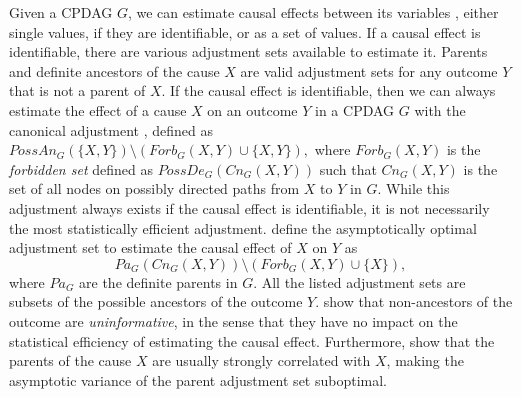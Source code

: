 Given a \ac{CPDAG} $G$, we can estimate causal effects between its variables \citep{maathuis2009estimating}, either single values, if they are identifiable, or as a set of values.
If a causal effect is identifiable, there are various adjustment sets available to estimate it.
Parents \citep{maathuis2015generalized} and definite ancestors \citep{henckel2024adjustment} of the cause $X$ are valid adjustment sets for any outcome $Y$ that is not a parent of $X$.
If the causal effect is identifiable, then we can always estimate the effect of a cause $X$ on an outcome $Y$ in a CPDAG $G$ with the canonical adjustment \citep{perkovic2018complete}, defined as 
$
PossAn_G(\{X,Y\}) \setminus (Forb_G(X,Y) \cup \{X, Y \}),
$
where $Forb_G(X,Y)$ is the \emph{forbidden set} defined as $PossDe_G(Cn_G(X,Y))$ such that $Cn_G(X,Y)$ is the set of all nodes on  possibly directed paths from $X$ to $Y$ in $G$. While this adjustment always exists if the causal effect is identifiable, it is not necessarily the most statistically efficient adjustment.
\citet{henckel2022graphical} define the asymptotically optimal adjustment set to estimate the causal effect of $X$ on $Y$ as
$$
Pa_G(Cn_G(X,Y)) \setminus (Forb_G(X,Y) \cup \{X\}),
$$
where $Pa_G$ are the definite parents in $G$.
All the listed adjustment sets are subsets of the possible ancestors of the outcome $Y$.
\citet{guo2023variable} show that non-ancestors of the outcome are \emph{uninformative}, in the sense that they have no impact on the statistical efficiency of estimating the causal effect.
Furthermore, \citet{henckel2022graphical} show that the parents of the cause $X$ are usually strongly correlated with $X$, making the asymptotic variance of the parent adjustment set suboptimal.